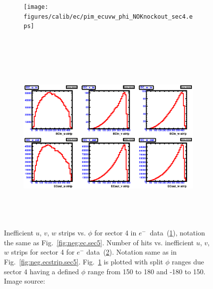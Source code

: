 \begin{figure}[htpb]
  \centering
  \begin{subfigure}[b]{\figwidth}
  \texttt{[image: figures/calib/ec/pim\_ecuvw\_phi\_NOKnockout\_sec4.eps]}\caption{}\label{fig:EC_I_IV}
  \end{subfigure}%
  \\
  \begin{subfigure}[b]{\figwidth}
  \includegraphics[width=\figwidth, height=3.5in,valign=c]{figures/calib/ec/pim_ecuvw_NOKnockout_sec4.eps}\caption{}\label{fig:EC_II_IV}
  \end{subfigure}%
      \caption {Inefficient  $u$, $v$, $w$ strips vs. $\phi$ for sector 4 in  $e^{-} \ $ data~(\ref{fig:EC_I_IV}), notation the same as Fig.~\ref{fig:neg:ec.sec5}. Number of hits vs. inefficient  $u$, $v$, $w$ strips for sector 4 for $e^-$ data~(\ref{fig:EC_II_IV}). Notation same as in Fig.~\ref{fig:neg.ecstrip.sec5}. Fig.~\ref{fig:EC_I_IV} is plotted with split $\phi$ ranges due sector 4 having a defined $\phi$ range from 150 to 180 and -180 to 150. Image source:~\cite{clas.thesis.kunkel}}
        \label{fig:EC_no_IV}
\end{figure}



